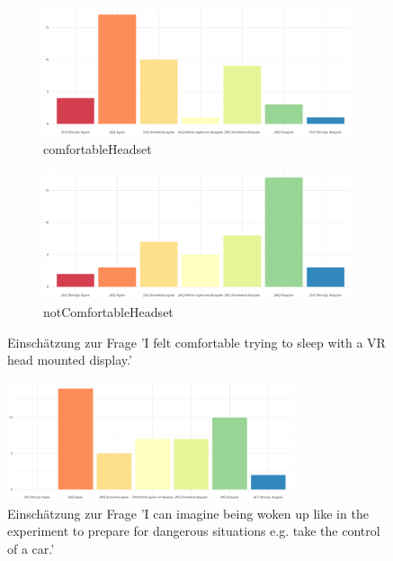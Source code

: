 \begin{figure}[H]
	\centering
	\begin{subfigure}{0.48\textwidth}
		\includegraphics[width=\textwidth]{./_StudyResults/comfortableHeadset}
		\caption{comfortableHeadset}
		\label{fig:comfortableHeadset}
	\end{subfigure}
	\hfill
	\begin{subfigure}{0.48\textwidth}
		\includegraphics[width=\textwidth]{./_StudyResults/notComfortableHeadset}
		\caption{notComfortableHeadset}
		\label{fig:notComfortableHeadset}
	\end{subfigure}
	\caption{Einschätzung zur Frage 'I felt comfortable trying to sleep with a VR head mounted display.'} %
\end{figure}


\begin{figure}[H]
	\centering
	\includegraphics[width=0.75\textwidth]{./_StudyResults/imagineWakingUp}
	\caption{Einschätzung zur Frage 'I can imagine being woken up like in the experiment to prepare for dangerous situations e.g. take the control of a car.'}
	\label{fig:imagineWakingUp}
\end{figure}

